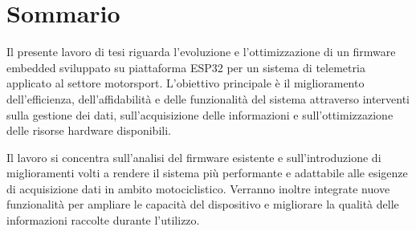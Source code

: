 \cleardoublepage
{}
{}

\begingroup
\let\clearpage\relax
\let\cleardoublepage\relax

\vspace*{4cm}

\chapter*{Sommario}

Il presente lavoro di tesi riguarda l’evoluzione e l’ottimizzazione di un firmware embedded sviluppato 
su piattaforma ESP32 per un sistema di telemetria applicato al settore motorsport. L’obiettivo principale
è il miglioramento dell’efficienza, dell’affidabilità e delle funzionalità del sistema attraverso 
interventi sulla gestione dei dati, sull’acquisizione delle informazioni e sull’ottimizzazione delle 
risorse hardware disponibili.

Il lavoro si concentra sull’analisi del firmware esistente e sull’introduzione di miglioramenti volti
a rendere il sistema più performante e adattabile alle esigenze di acquisizione dati in ambito motociclistico.
Verranno inoltre integrate nuove funzionalità per ampliare le capacità del dispositivo e migliorare 
la qualità delle informazioni raccolte durante l’utilizzo.

\vspace*{\fill}

\endgroup